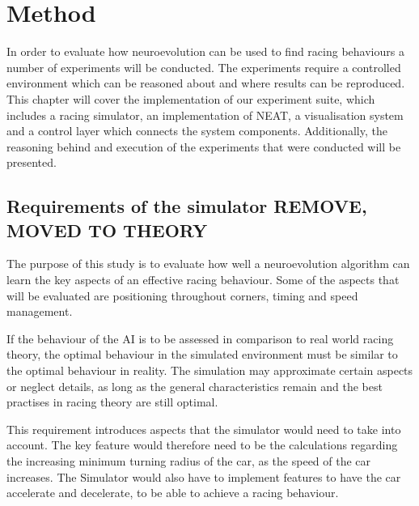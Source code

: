 
\chapter{Method}

In order to evaluate how neuroevolution can be used to find racing behaviours a number of experiments will be conducted. The experiments require a controlled environment which can be reasoned about and where results can be reproduced. This chapter will cover the implementation of our experiment suite, which includes a racing simulator, an implementation of NEAT, a visualisation system and a control layer which connects the system components. Additionally, the reasoning behind and execution of the experiments that were conducted will be presented. 

\section{Requirements of the simulator REMOVE, MOVED TO THEORY}
The purpose of this study is to evaluate how well a neuroevolution algorithm can learn the key aspects of an effective racing behaviour. Some of the aspects that will be evaluated are positioning throughout corners, timing and speed management. 

If the behaviour of the AI is to be assessed in comparison to real world racing theory, the optimal behaviour in the simulated environment must be similar to the optimal behaviour in reality. The simulation may approximate certain aspects or neglect details, as long as the general characteristics remain and the best practises in racing theory are still optimal. 

This requirement introduces aspects that the simulator would need to take into account. The key feature would therefore need to be the calculations regarding the increasing minimum turning radius of the car, as the speed of the car increases. The Simulator would also have to implement features to have the car accelerate and decelerate, to be able to achieve a racing behaviour.



